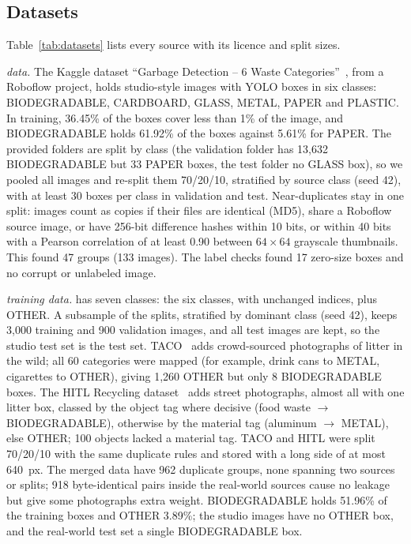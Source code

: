 \subsection{Datasets}
\label{subsec:datasets}

Table~\ref{tab:datasets} lists every source with its licence and split sizes.

\textit{\genone data.} The Kaggle dataset ``Garbage Detection -- 6 Waste Categories''~\cite{viswaprakash2024garbage}, from a Roboflow project, holds studio-style images with YOLO boxes in six classes: BIODEGRADABLE, CARDBOARD, GLASS, METAL, PAPER and PLASTIC. In training, 36.45\% of the boxes cover less than 1\% of the image, and BIODEGRADABLE holds 61.92\% of the boxes against 5.61\% for PAPER. The provided folders are split by class (the validation folder has 13,632 BIODEGRADABLE but 33 PAPER boxes, the test folder no GLASS box), so we pooled all images and re-split them 70/20/10, stratified by source class (seed 42), with at least 30 boxes per class in validation and test. Near-duplicates stay in one split: images count as copies if their files are identical (MD5), share a Roboflow source image, or have 256-bit difference hashes within 10 bits, or within 40 bits with a Pearson correlation of at least 0.90 between $64\times64$ grayscale thumbnails. This found 47 groups (133 images). The label checks found 17 zero-size boxes and no corrupt or unlabeled image.

\textit{\gentwo training data.} \gentwo has seven classes: the six \genone classes, with unchanged indices, plus OTHER. A subsample of the \genone splits, stratified by dominant class (seed 42), keeps 3,000 training and 900 validation images, and all test images are kept, so the \gentwo studio test set is the \genone test set. TACO~\cite{proenca2020taco} adds crowd-sourced photographs of litter in the wild; all 60 categories were mapped (for example, drink cans to METAL, cigarettes to OTHER), giving 1,260 OTHER but only 8 BIODEGRADABLE boxes. The HITL Recycling dataset~\cite{hitl2026recycling} adds street photographs, almost all with one litter box, classed by the object tag where decisive (food waste $\to$ BIODEGRADABLE), otherwise by the material tag (aluminum $\to$ METAL), else OTHER; 100 objects lacked a material tag. TACO and HITL were split 70/20/10 with the same duplicate rules and stored with a long side of at most 640~px. The merged data have 962 duplicate groups, none spanning two sources or splits; 918 byte-identical pairs inside the real-world sources cause no leakage but give some photographs extra weight. BIODEGRADABLE holds 51.96\% of the training boxes and OTHER 3.89\%; the studio images have no OTHER box, and the real-world test set a single BIODEGRADABLE box.

